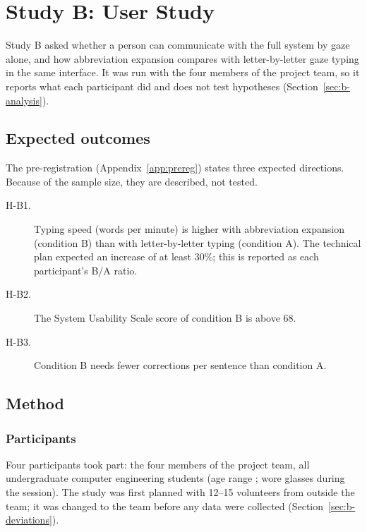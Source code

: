 \chapter{Study B: User Study}
\label{ch:study-b}


Study B asked whether a person can communicate with the full system by gaze alone, and how
abbreviation expansion compares with letter-by-letter gaze typing in the same interface.
It was run with the four members of the project team, so it reports what each participant did
and does not test hypotheses (Section~\ref{sec:b-analysis}).

\section{Expected outcomes}
\label{sec:b-hypotheses}

The pre-registration (Appendix~\ref{app:prereg}) states three expected directions. Because of the
sample size, they are described, not tested.

\begin{description}
  \item[H-B1.] Typing speed (words per minute) is higher with abbreviation expansion (condition B)
        than with letter-by-letter typing (condition A). The technical plan expected an increase of at
        least 30\%; this is reported as each participant's B/A ratio.
  \item[H-B2.] The System Usability Scale score of condition B is above 68.
  \item[H-B3.] Condition B needs fewer corrections per sentence than condition A.
\end{description}

\section{Method}
\label{sec:b-method}

\subsection{Participants}
\label{sec:b-participants}

Four participants took part: the four members of the project team, all undergraduate computer
engineering students (age range ;  wore glasses during the session).
The study was first planned with 12--15 volunteers from outside the team; it was changed to the
team before any data were collected (Section~\ref{sec:b-deviations}).

